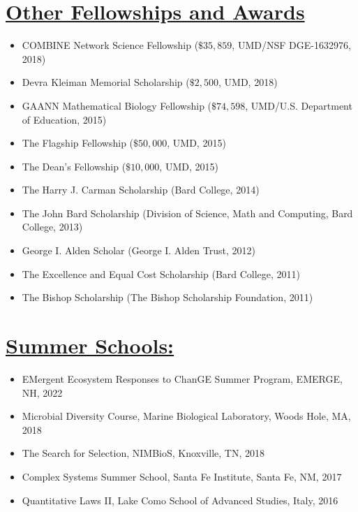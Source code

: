 \documentclass[]{res}
\begin{document}
\begin{resume}
   \section{\underline{Other Fellowships and Awards}} %
\begin{itemize}[leftmargin=*]
\item[] COMBINE Network Science Fellowship ($\$35,859$, UMD/NSF DGE-1632976, 2018)
\item[] Devra Kleiman Memorial Scholarship ($\$2,500$, UMD, 2018)
\item[] GAANN Mathematical Biology Fellowship ($\$74,598$, UMD/U.S. Department of Education, 2015)
\item[] The Flagship Fellowship ($\$50,000$, UMD, 2015)
\item[] The Dean's Fellowship ($\$10,000$, UMD, 2015)
\item[] The Harry J. Carman Scholarship (Bard College, 2014)
\item[] The John Bard Scholarship (Division of Science, Math and Computing, Bard College, 2013)
\item[] George I. Alden Scholar (George I. Alden Trust, 2012)%
\item[] The Excellence and Equal Cost Scholarship (Bard College, 2011) 
\item[] The Bishop Scholarship (The Bishop Scholarship Foundation, 2011)
\end{itemize}
  
\section{\underline{Summer Schools:}}%
\begin{itemize}[leftmargin=*]
\item[] {EMergent Ecosystem Responses to ChanGE Summer Program}, EMERGE, NH, 2022
\item[] {Microbial Diversity Course}, Marine Biological Laboratory, Woods Hole, MA, 2018
\item[] {The Search for Selection}, NIMBioS, Knoxville, TN, 2018
\item[] {Complex Systems Summer School}, Santa Fe Institute, Santa Fe, NM, 2017
\item[] {Quantitative Laws II}, Lake Como School of Advanced Studies, Italy, 2016  
 \end{itemize}  
 

\end{resume}
\end{document}
